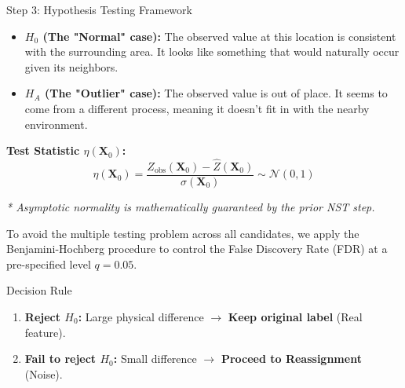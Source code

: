 \documentclass[10pt, aspectratio=169]{beamer}
\begin{document}
\begin{frame}{Step 3: Hypothesis Testing Framework}
    \begin{itemize}
        \item \textbf{$H_0$ (The "Normal" case):} The observed value at this location is consistent with the surrounding area. {\color{gray} It looks like something that would naturally occur given its neighbors.}
        \item \textbf{$H_A$ (The "Outlier" case):} The observed value is out of place. {\color{gray} It seems to come from a different process, meaning it doesn't fit in with the nearby environment.}
    \end{itemize}

    \vspace{0.2cm}
    \textbf{Test Statistic $\eta(\mathbf{X}_0)$:}
    \begin{equation}
        \eta(\mathbf{X}_0) = \frac{Z_{\text{obs}}(\mathbf{X}_0) - \hat{Z}(\mathbf{X}_0)}{\sigma(\mathbf{X}_0)} \sim \mathcal{N}(0,1)
    \end{equation}
    {\centering \color{gray}\scriptsize \textit{* Asymptotic normality is mathematically guaranteed by the prior NST step.}\\ \par}

    To avoid the multiple testing problem across all candidates, we apply the Benjamini-Hochberg procedure to control the False Discovery Rate (FDR) at a pre-specified level $q=0.05$.

    \begin{block}{Decision Rule}
        \begin{enumerate}
            \item \textbf{Reject $H_0$:} Large physical difference $\to$ \textbf{Keep original label} (Real feature).
            \item \textbf{Fail to reject $H_0$:} Small difference $\to$ \textbf{Proceed to Reassignment} (Noise).
        \end{enumerate}
    \end{block}
\end{frame}
\end{document}
